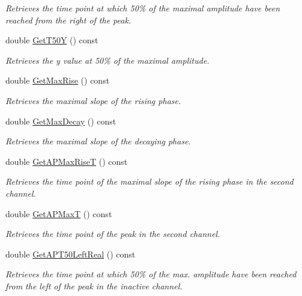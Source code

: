 \begin{DoxyCompactItemize}
\begin{DoxyCompactList}\small\item\em Retrieves the time point at which 50\% of the maximal amplitude have been reached from the right of the peak. \item\end{DoxyCompactList}\item 
double \hyperlink{classRecording_a4a42b50c87111915907d8edd4bbdadfe}{GetT50Y} () const 
\begin{DoxyCompactList}\small\item\em Retrieves the y value at 50\% of the maximal amplitude. \item\end{DoxyCompactList}\item 
double \hyperlink{classRecording_aabad745e2588229871cb5b09727f65dd}{GetMaxRise} () const 
\begin{DoxyCompactList}\small\item\em Retrieves the maximal slope of the rising phase. \item\end{DoxyCompactList}\item 
double \hyperlink{classRecording_a10828c1a1db5f3a452ef6d4558a3cf05}{GetMaxDecay} () const 
\begin{DoxyCompactList}\small\item\em Retrieves the maximal slope of the decaying phase. \item\end{DoxyCompactList}\item 
double \hyperlink{classRecording_a8786f03e5b1de85b2032551d89b3da79}{GetAPMaxRiseT} () const 
\begin{DoxyCompactList}\small\item\em Retrieves the time point of the maximal slope of the rising phase in the second channel. \item\end{DoxyCompactList}\item 
double \hyperlink{classRecording_a2aeab23d129ef86ac4570b253f7c9570}{GetAPMaxT} () const 
\begin{DoxyCompactList}\small\item\em Retrieves the time point of the peak in the second channel. \item\end{DoxyCompactList}\item 
double \hyperlink{classRecording_aae3cfa487a207709e3f77984a02c78a1}{GetAPT50LeftReal} () const 
\begin{DoxyCompactList}\small\item\em Retrieves the time point at which 50\% of the max. amplitude have been reached from the left of the peak in the inactive channel. \item\end{DoxyCompactList}\item 

\end{DoxyCompactItemize}
